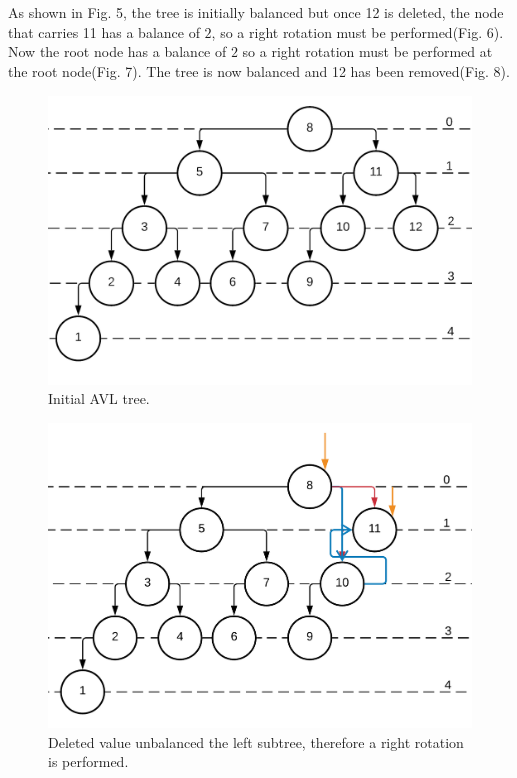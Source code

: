 \documentclass[journal]{IEEEtran}
\begin{document}
\section{}

As shown in Fig. 5, the tree is initially balanced but once 12 is deleted, 
the node that carries 11 has a balance of $2$, so a right rotation must 
be performed(Fig. 6). Now the root node has a balance of $2$ so a 
right rotation must be performed at the root node(Fig. 7). The tree is now balanced 
and 12 has been removed(Fig. 8).


\begin{figure}[h!]
	\includegraphics[scale = 0.16]{avl21.png}
	\caption{Initial AVL tree.}
\end{figure}


\begin{figure}[h!]
	\includegraphics[scale = 0.15]{avl22.png}
	\caption{Deleted value unbalanced the left subtree, therefore a right rotation is performed.}
\end{figure}
\end{document}
